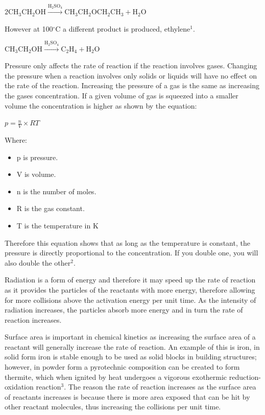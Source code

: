 $\mathrm{2CH_3CH_2OH}\xrightarrow{\mathrm{H_2SO_4}}\mathrm{CH_3CH_2OCH_2CH_3}+\mathrm{H_2O}$

However at 100$^{\circ}$C a different product is produced, ethylene$^1$.

$\mathrm{CH_3CH_2OH}\xrightarrow{\mathrm{H_2SO_4}}\mathrm{C_2H_4}+\mathrm{H_2O}$

Pressure only affects the rate of reaction if the reaction involves gases. Changing the pressure when a reaction involves only solids or liquids will have no effect on the rate of the reaction. Increasing the pressure of a gas is the same as increasing the gases concentration. If a given volume of gas is squeezed into a smaller volume the concentration is higher as shown by the equation:

 $p= \frac{n}{V}\times{RT}$

Where:
\begin{itemize}
\item p is pressure.
\item V is volume.
\item n is the number of moles.
\item R is the gas constant.
\item T is the temperature in K
\end{itemize}

Therefore this equation shows that as long as the temperature is constant, the pressure is directly proportional to the concentration. If you double one, you will also double the other$^2$.

Radiation is a form of energy and therefore it may speed up the rate of reaction as it provides the particles of the reactants with more energy, therefore allowing for more collisions above the activation energy per unit time. As the intensity of radiation increases, the particles absorb more energy and in turn the rate of reaction increases.

Surface area is important in chemical kinetics as increasing the surface area of a reactant will generally increase the rate of reaction. An example of this is iron, in solid form iron is stable enough to be used as solid blocks in building structures; however, in powder form a pyrotechnic composition can be created to form thermite, which when ignited by heat undergoes a vigorous exothermic reduction-oxidation reaction$^3$. The reason the rate of reaction increases as the surface area of reactants increases is because there is more area exposed that can be hit by other reactant molecules, thus increasing the collisions per unit time.

